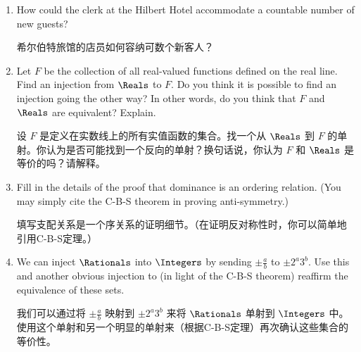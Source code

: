 \begin{enumerate}
    \item How could the clerk at the Hilbert Hotel accommodate a countable
    number of new guests?
    
    希尔伯特旅馆的店员如何容纳可数个新客人？
    \wbvfill
    
    \item Let $F$ be the collection of all real-valued functions 
    defined on the real line.
    Find an injection from $\Reals$ to $F$.  Do you 
    think it is possible to find an injection going the other way?
    In 
    other words, do you think that $F$ and $\Reals$ are equivalent?  Explain.
    
    设 $F$ 是定义在实数线上的所有实值函数的集合。找一个从 $\Reals$ 到 $F$ 的单射。你认为是否可能找到一个反向的单射？换句话说，你认为 $F$ 和 $\Reals$ 是等价的吗？请解释。
    \wbvfill
    
    \workbookpagebreak
    
    \item Fill in the details of the proof that dominance is an ordering relation.
    (You may simply cite the C-B-S theorem in proving anti-symmetry.)
    
    填写支配关系是一个序关系的证明细节。（在证明反对称性时，你可以简单地引用C-B-S定理。）
    
    \wbvfill
    
    \item We can inject $\Rationals$ into $\Integers$ by sending 
    $\displaystyle \pm \frac{a}{b}$ to $\displaystyle \pm 2^a3^b$.
    Use this and another obvious injection to (in light of the C-B-S 
    theorem) reaffirm the equivalence of these sets.
    
    我们可以通过将 $\displaystyle \pm \frac{a}{b}$ 映射到 $\displaystyle \pm 2^a3^b$ 来将 $\Rationals$ 单射到 $\Integers$ 中。使用这个单射和另一个明显的单射来（根据C-B-S定理）再次确认这些集合的等价性。
    \wbvfill
    
    \end{enumerate}
    

